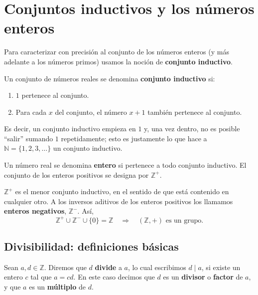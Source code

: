 \documentclass[12pt,a4paper]{book}
\begin{document}
  \section{Conjuntos inductivos y los números enteros}
  
  Para caracterizar con precisión al conjunto de los números enteros (y más adelante a los números primos) usamos la noción de \textbf{conjunto inductivo}.
  
  \begin{definicion}
    Un conjunto de números reales se denomina \textbf{conjunto inductivo} si:
    \begin{enumerate}[label=(\alph*)]
      \item $1$ pertenece al conjunto.
      \item Para cada $x$ del conjunto, el número $x+1$ también pertenece al conjunto.
    \end{enumerate}
  \end{definicion}
  
  Es decir, un conjunto inductivo empieza en $1$ y, una vez dentro, no es posible ``salir'' sumando $1$ repetidamente; esto es justamente lo que hace a $\mathbb{N}=\{1,2,3,\dots\}$ un conjunto inductivo.
  
  \begin{definicion}[Entero]
    Un número real se denomina \textbf{entero} si pertenece a todo conjunto inductivo. El conjunto de los enteros positivos se designa por $\mathbb{Z}^+$.
  \end{definicion}
  
  $\mathbb{Z}^+$ es el menor conjunto inductivo, en el sentido de que está contenido en cualquier otro. A los inversos aditivos de los enteros positivos los llamamos \textbf{enteros negativos}, $\mathbb{Z}^-$. Así,
  \begin{equation*}
    \mathbb{Z}^+ \cup \mathbb{Z}^- \cup \{0\} = \mathbb{Z} \quad \Longrightarrow \quad (\mathbb{Z},+) \text{ es un grupo.}
  \end{equation*}
  
  \subsection{Divisibilidad: definiciones básicas}
  
  \begin{definicion}
    Sean $a,d \in \mathbb{Z}$. Diremos que $d$ \textbf{divide} a $a$, lo cual escribimos $d \mid a$, si existe un entero $c$ tal que $a=cd$. En este caso decimos que $d$ es un \textbf{divisor} o \textbf{factor} de $a$, y que $a$ es un \textbf{múltiplo} de $d$.
  \end{definicion}
  
\end{document}
